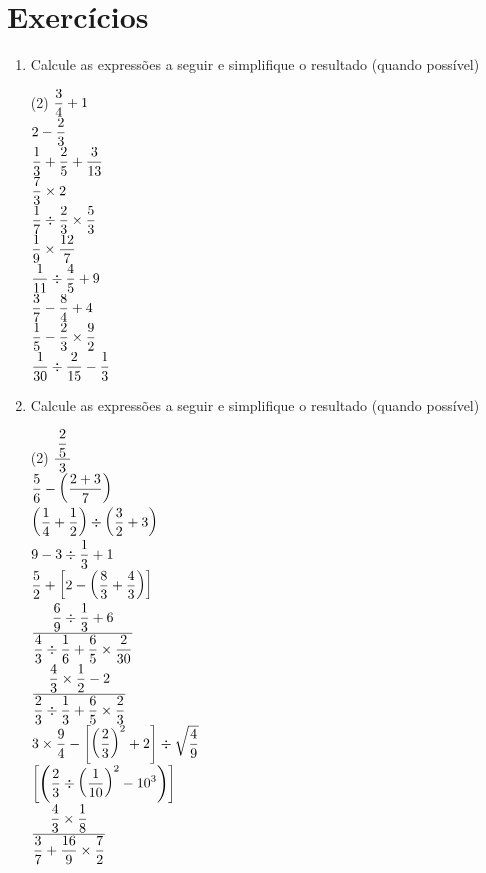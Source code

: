 	\section{Exercícios}
	\begin{enumerate}
		\item Calcule as expressões a seguir e simplifique o resultado (quando possível)
		\begin{tasks}(2)
			\task $\df{3}{4} + 1 $ \\[-0.25cm]
			\task $2 - \df{2}{3} $ \\[-0.25cm]
			\task $\df{1}{3} + \df{2}{5} + \df{3}{13} $ \\[-0.25cm]
			\task $\df{7}{3} \times 2 $ \\[-0.25cm]
			\task $\df{1}{7} \div \df{2}{3} \times \df{5}{3} $ \\[-0.25cm]
			\task $\df{1}{9} \times \df{12}{7} $ \\[-0.25cm]
			\task $\df{1}{11} \div \df{4}{5} + 9 $ \\[-0.25cm]
			\task $\df{3}{7} - \df{8}{4} + 4 $ \\[-0.25cm]
			\task $\df{1}{5} - \df{2}{3} \times \df{9}{2} $ \\[-0.25cm]
			\task $\df{1}{30} \div \df{2}{15} - \df{1}{3} $
		\end{tasks}
		
		\item Calcule as expressões a seguir e simplifique o resultado (quando possível)
		\begin{tasks}(2)
			\task $\df{\,\df{2}{5}\,}{3} $ \\[-0.25cm]
			\task $\df{5}{6} - \left(\df{2+3}{7}\right) $ \\[-0.25cm]
			\task $\left(\df{1}{4} + \df{1}{2}\right) \div \left(\df{3}{2} + 3\right) $ \\[-0.25cm]
			\task $9 - 3 \div \df{1}{3} + 1 $\\[-0.25cm]
			\task $\df{5}{2} + \left[2 - \left(\df{8}{3} + \df{4}{3}\right)\right] $ \\[-0.25cm]
			\task $\df{\df{6}{9} \div \df{1}{3} + 6}{\df{4}{3} \div \df{1}{6} + \df{6}{5} \times \df{2}{30}} $ \\[-0.25cm]
			\task $\df{\df{4}{3} \times \df{1}{2} - 2}{\df{2}{3} \div \df{1}{3} + \df{6}{5} \times \df{2}{3}} $ \\[-0.25cm]
			\task $3 \times \df{9}{4} - {\left[\left(\df{2}{3}\right)^2 + 2\right] \div \sqrt{\df{4}{9}}} $ \\[-0.25cm]
			\task $\left[ \left(\df{2}{3} \div \left(\df{1}{10}\right)^2 - 10^3\right)\right] $ \\[-0.25cm]
			\task $\df{\df{4}{3} \times \df{1}{8}}{\df{3}{7} + \df{16}{9} \times \df{7}{2}} $
		\end{tasks}
		

\end{enumerate}
